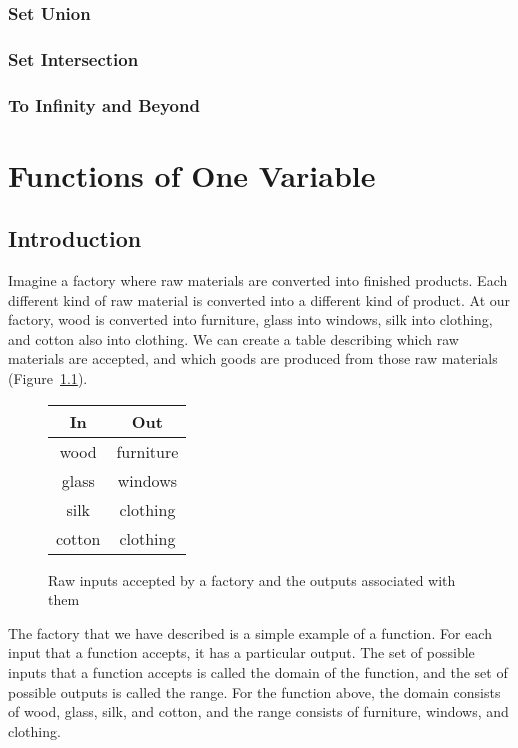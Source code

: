 \documentclass[a4paper,10pt]{report}
\begin{document}
\subsection{Set Union}

\subsection{Set Intersection}

\subsection{To Infinity and Beyond}

\chapter{Functions of One Variable}

\section{Introduction}

Imagine a factory where raw materials are converted into finished products.
Each different kind of raw material is converted into a different kind of
product. At our factory, wood is converted into furniture, glass into windows,
silk into clothing, and cotton also into clothing. We can create a table
describing which raw materials are accepted, and which goods are produced from
those raw materials (Figure~\ref{fov:factory}).

\begin{figure}
 \renewcommand{\arraystretch}{1.2}
 \begin{tabular}{|c|c|}
  \hline
  \textbf{In} & \textbf{Out} \\
  \hline
  wood & furniture \\
  glass & windows \\
  silk & clothing \\
  cotton & clothing \\
  \hline
 \end{tabular}

 \caption{Raw inputs accepted by a factory and the outputs associated with
 them}
 \label{fov:factory}
\end{figure}

The factory that we have described is a simple example of a \gls{function}. For
each input that a function accepts, it has a particular output. The set of
possible inputs that a function accepts is called the \gls{domain} of the
function, and the set of possible outputs is called the \gls{range}. For the
function above, the domain consists of wood, glass, silk, and cotton, and the
range consists of furniture, windows, and clothing.
\end{document}
